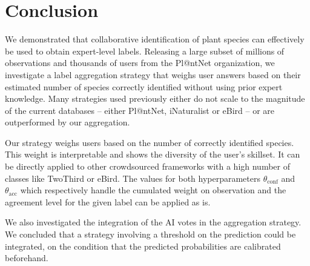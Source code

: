 \section{Conclusion}

We demonstrated that collaborative identification of plant species can effectively be used to obtain expert-level labels.
Releasing a large subset of millions of observations and thousands of users from the Pl@ntNet organization, we investigate a label aggregation strategy that weighs user answers based on their estimated number of species correctly identified without using prior expert knowledge.
Many strategies used previously either do not scale to the magnitude of the current databases -- either Pl@ntNet, iNaturalist or eBird -- or are outperformed by our aggregation.

Our strategy weighs users based on the number of correctly identified species. This weight is interpretable and shows the diversity of the user's skillset.
It can be directly applied to other crowdsourced frameworks with a high number of classes like TwoThird or eBird.
The values for both hyperparameters $\theta_\mathrm{conf}$ and $\theta_\mathrm{acc}$ which respectively handle the cumulated weight on observation and the agreement level for the given label can be applied as is.

We also investigated the integration of the AI votes in the aggregation strategy.
We concluded that a strategy involving a threshold on the prediction could be integrated, on the condition that the predicted probabilities are calibrated beforehand.